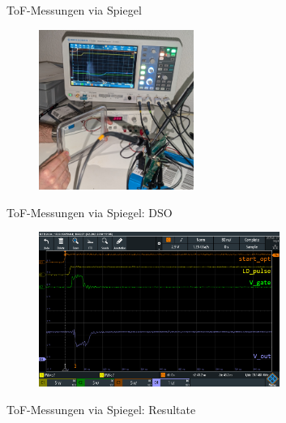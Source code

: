 \begin{frame}{ToF-Messungen via Spiegel}
    \begin{figure}
        \includegraphics[width=0.45\textwidth]{../documentation/graphics/spiegel_setup.jpg}
    \end{figure}
\end{frame}

\begin{frame}{ToF-Messungen via Spiegel: DSO}
    \begin{figure}
        \includegraphics[width=0.7\textwidth]{../documentation/graphics/spiegel_initial.png}
    \end{figure}
\end{frame}

\begin{frame}{ToF-Messungen via Spiegel: Resultate}
    \begin{figure}
        
    \end{figure}
\end{frame}

